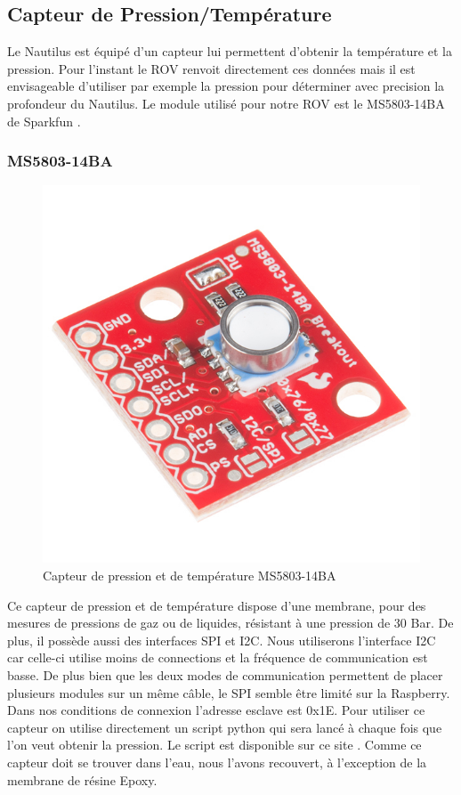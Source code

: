 \documentclass[a4paper,11pt]{report}
\begin{document}
				\subsection{Capteur de Pression/Température}
		Le Nautilus est équipé d'un capteur lui permettent d'obtenir la température et la pression. Pour l'instant le ROV renvoit directement ces données mais il est envisageable d'utiliser par exemple la pression pour déterminer avec precision la profondeur du Nautilus. Le module utilisé pour notre ROV est le MS5803-14BA de Sparkfun \cite{ref11}.
		\newline
		
			\subsubsection{MS5803-14BA}
			\begin{figure}[!h]
					\begin{center}
						\includegraphics[scale=1]{Photos/Capture30.jpg}
						\caption{Capteur de pression et de température MS5803-14BA}
					\end{center}
				\end{figure}
			Ce capteur de pression et de température dispose d'une membrane, pour des mesures de pressions de gaz ou de liquides, résistant à une pression de 30 Bar. De plus, il possède aussi des interfaces SPI et I2C. Nous utiliserons l'interface I2C car celle-ci utilise moins de connections et la fréquence de communication est basse. De plus bien que les deux modes de communication permettent de placer plusieurs modules sur un même câble, le SPI semble être limité sur la Raspberry. Dans nos conditions de connexion l'adresse esclave est 0x1E. Pour utiliser ce capteur on utilise directement un script python qui sera lancé à chaque fois que l'on veut obtenir la pression. Le script est disponible sur ce site \cite{ref12}.
			Comme ce capteur doit se trouver dans l'eau, nous l'avons recouvert, à l’exception de la membrane de résine Epoxy. \newline
			
\end{document}
